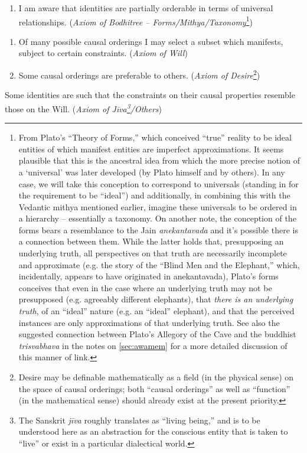 \documentclass[pra,twocolumn,groupedaddress,10pt]{revtex4}
\theoremstyle{definition}
\begin{document}
\begin{enumerate}[label={[\textbf{\arabic*}]},start=0]
\begin{enumerate}
			\item I am aware that identities are partially orderable in terms of universal relationships. (\emph{Axiom of Bodhitree -- Forms/Mithya/Taxonomy}\footnote{From Plato's ``Theory of Forms,'' which conceived ``true'' reality to be ideal entities of which manifest entities are imperfect approximations. It seems plausible that this is the ancestral idea from which the more precise notion of a `universal' was later developed (by Plato himself and by others). In any case, we will take this conception to correspond to universals (standing in for the requirement to be ``ideal'') and additionally, in combining this with the Vedantic mithya mentioned earlier, imagine these universals to be ordered in a hierarchy -- essentially a taxonomy. On another note, the conception of the forms bears a resemblance to the Jain \emph{anekantavada} and it's possible there is a connection between them. While the latter holds that, presupposing an underlying truth, all perspectives on that truth are necessarily incomplete and approximate (e.g. the story of the ``Blind Men and the Elephant,'' which, incidentally, appears to have originated in anekantavada), Plato's forms conceives that even in the case where an underlying truth may not be presupposed (e.g. agreeably different elephants), that \emph{there is an underlying truth}, of an ``ideal'' nature (e.g. an ``ideal'' elephant), and that the perceived instances are only approximations of that underlying truth. See also the suggested connection between Plato's Allegory of the Cave and the buddhist \emph{trisvabhava} in the notes on \autoref{sec:awamem} for a more detailed discussion of this manner of link.})
		\end{enumerate}
	\item \begin{enumerate}
		\item Of many possible causal orderings I may select a subset which manifests, subject to certain constraints. (\emph{Axiom of Will})
		\item Some causal orderings are preferable to others. (\emph{Axiom of Desire}\footnote{Desire may be definable mathematically as a field (in the physical sense) on the space of causal orderings; both ``causal orderings'' as well as ``function'' (in the mathematical sense) should already exist at the present priority.})
		\end{enumerate}
	\item Some identities are such that the constraints on their causal properties resemble those on the Will. (\emph{Axiom of J\={i}va\footnote{The Sanskrit \emph{j\={i}va} roughly translates as ``living being,'' and is to be understood here as an abstraction for the conscious entity that is taken to ``live'' or exist in a particular dialectical world.}/Others})

\end{enumerate}
\end{document}
